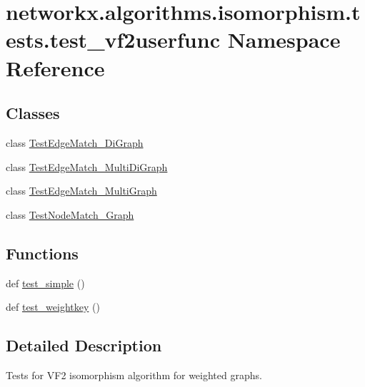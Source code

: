 \hypertarget{namespacenetworkx_1_1algorithms_1_1isomorphism_1_1tests_1_1test__vf2userfunc}{}\section{networkx.\+algorithms.\+isomorphism.\+tests.\+test\+\_\+vf2userfunc Namespace Reference}
\label{namespacenetworkx_1_1algorithms_1_1isomorphism_1_1tests_1_1test__vf2userfunc}
\subsection*{Classes}
\begin{DoxyCompactItemize}
\item 
class \hyperlink{classnetworkx_1_1algorithms_1_1isomorphism_1_1tests_1_1test__vf2userfunc_1_1TestEdgeMatch__DiGraph}{Test\+Edge\+Match\+\_\+\+Di\+Graph}
\item 
class \hyperlink{classnetworkx_1_1algorithms_1_1isomorphism_1_1tests_1_1test__vf2userfunc_1_1TestEdgeMatch__MultiDiGraph}{Test\+Edge\+Match\+\_\+\+Multi\+Di\+Graph}
\item 
class \hyperlink{classnetworkx_1_1algorithms_1_1isomorphism_1_1tests_1_1test__vf2userfunc_1_1TestEdgeMatch__MultiGraph}{Test\+Edge\+Match\+\_\+\+Multi\+Graph}
\item 
class \hyperlink{classnetworkx_1_1algorithms_1_1isomorphism_1_1tests_1_1test__vf2userfunc_1_1TestNodeMatch__Graph}{Test\+Node\+Match\+\_\+\+Graph}
\end{DoxyCompactItemize}
\subsection*{Functions}
\begin{DoxyCompactItemize}
\item 
def \hyperlink{namespacenetworkx_1_1algorithms_1_1isomorphism_1_1tests_1_1test__vf2userfunc_a5892b3ee7bc84b517448586a8020e46d}{test\+\_\+simple} ()
\item 
def \hyperlink{namespacenetworkx_1_1algorithms_1_1isomorphism_1_1tests_1_1test__vf2userfunc_abfdbfe3b2a07ec112ce7925351f161e7}{test\+\_\+weightkey} ()
\end{DoxyCompactItemize}


\subsection{Detailed Description}
\begin{DoxyVerb}    Tests for VF2 isomorphism algorithm for weighted graphs.
\end{DoxyVerb}
 


